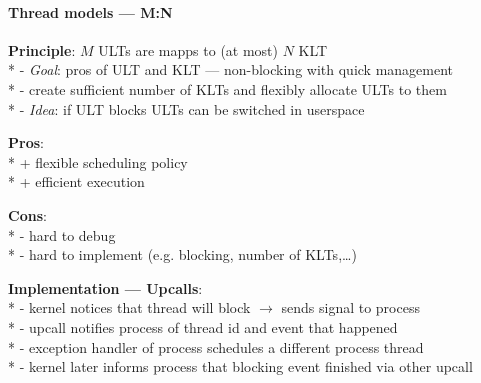 \paragraph{Thread models --- M:N}
\begin{items}
  \item \textbf{Principle}: \( M \) ULTs are mapps to (at most) \( N \) KLT \\*
    - \emph{Goal}: pros of ULT and KLT --- non-blocking with quick management \\*
    - create sufficient number of KLTs and flexibly allocate ULTs to them \\*
    - \emph{Idea}: if ULT blocks ULTs can be switched in userspace
  \item \textbf{Pros}: \\*
    + flexible scheduling policy \\*
    + efficient execution
  \item \textbf{Cons}: \\*
    - hard to debug \\*
    - hard to implement (e.g. blocking, number of KLTs,\dots)
  \item \textbf{Implementation --- Upcalls}: \\*
    - kernel notices that thread will block \( \to \) sends signal to process \\*
    - upcall notifies process of thread id and event that happened \\*
    - exception handler of process schedules a different process thread \\*
    - kernel later informs process that blocking event finished via other upcall
\end{items}